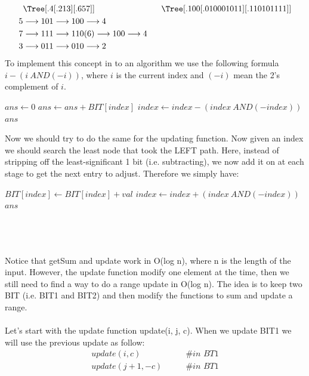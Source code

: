 \documentclass[a4paper]{article}
\begin{document}
\begin{align*}
&\Tree [.4 [.2 1 3 ] [.6 5 7 ] ] \qquad \qquad \qquad\qquad
\Tree [.100 [.010 001 011 ] [.110 101 111 ] ] \\ 
5 &\longrightarrow 101 \longrightarrow 100 \longrightarrow 4 \\
7 &\longrightarrow 111 \longrightarrow 110 (6) \longrightarrow 100 \longrightarrow 4 \\
3 &\longrightarrow 011 \longrightarrow 010 \longrightarrow 2\\
\end{align*}
To implement this concept in to an algorithm we use the following formula $i - (i \ AND (-i))$, where $i$ is the current index and $(-i)$ mean the 2's complement of $i$.
\begin{algorithmic}
\State $ans\gets 0$
	\State $ans \gets ans +BIT[index]$
	\State $index \gets index - (index \ AND (-index))$	
\EndWhile
\State \Return $ans$
\EndFunction
\end{algorithmic}
Now we should try to do the same for the updating function. Now given an index we should search the least node that took the LEFT path. Here, instead of stripping off the least-significant 1 bit (i.e. subtracting), we now add it on at each stage to get the next entry to adjust. Therefore we simply have:
\begin{algorithmic}
	\State $BIT[index] \gets BIT[index] +val$
	\State $index \gets index + (index \ AND (-index))$	
\EndWhile
\State \Return $ans$
\EndFunction
\end{algorithmic}
\qquad \\
\\
\\
Notice that getSum and update work in O(log n), where n is the length of the input. However, the update function modify one element at the time, then we still need to find a way to do a range update in O(log n). The idea is to keep two BIT (i.e. BIT1 and BIT2) and then modify the functions to sum and update a range. \\
\\
Let's start with the update function update(i, j, c). When we update BIT1 we will use the previous update as follow:
\begin{align*}
update(i, c)  \qquad & \# \textit{in BT1}\\ 	
update(j + 1, -c)  \qquad & \# \textit{in BT1}
\end{align*}
\end{document}
